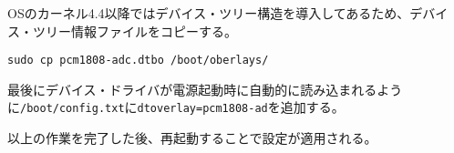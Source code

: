 \begin{enumerate}
  OSのカーネル4.4以降ではデバイス・ツリー構造を導入してあるため、デバイス・ツリー情報ファイルをコピーする。

\begin{lstlisting}[caption=デバイス・ツリー情報ファイルのコピーコマンド,label=device_tree]
sudo cp pcm1808-adc.dtbo /boot/oberlays/
\end{lstlisting}

  最後にデバイス・ドライバが電源起動時に自動的に読み込まれるように\texttt{/boot/config.txt}に\texttt{dtoverlay=pcm1808-ad}を追加する。

  以上の作業を完了した後、再起動することで設定が適用される。
\end{enumerate}
